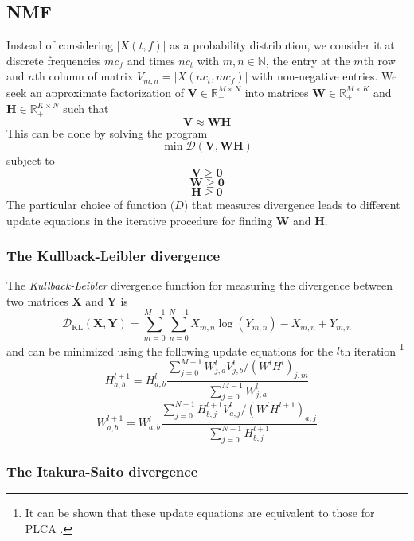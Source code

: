 \subsection{NMF}

Instead of considering $|X(t,f)|$ as a probability distribution, we
consider it at discrete frequencies $mc_{f}$ and times $nc_{t}$ with $m,n \in
\mathbb{N}$, the entry at the $m$th row and $n$th column of matrix
$V_{m,n}=|X(nc_{t},mc_{f})|$ with non-negative entries. We seek an
approximate factorization of $\boldsymbol{V} \in \mathbb{R}^{M \times N}_{+}$
into matrices $\boldsymbol{W} \in \mathbb{R}^{M \times K}_{+}$ and
$\boldsymbol{H} \in \mathbb{R}^{K \times N}_{+}$ such that
\begin{equation}
    \boldsymbol{V} \approx \boldsymbol{W}\boldsymbol{H}
    \label{eq:VaprxWH}
\end{equation}
This can be done by solving the program
\[
    \min \mathcal{D}(\boldsymbol{V},\boldsymbol{W}\boldsymbol{H})
\]
subject to
\[
    \boldsymbol{V} \geq \boldsymbol{0}
\]
\[
    \boldsymbol{W} \geq \boldsymbol{0}
\]
\[
    \boldsymbol{H} \geq \boldsymbol{0}
\]
The particular choice of function $\mathcal(D)$ that measures divergence leads
to different update equations in the iterative procedure for finding
$\boldsymbol{W}$ and $\boldsymbol{H}$.

\subsubsection{The Kullback-Leibler divergence \cite{lee2001algorithms}}

The \textit{Kullback-Leibler} divergence function for measuring the divergence
between two matrices $\boldsymbol{X}$ and $\boldsymbol{Y}$ is
\[
    \mathcal{D}_{\text{KL}}(\boldsymbol{X},\boldsymbol{Y}) =
    \sum_{m=0}^{M-1}\sum_{n=0}^{N-1} X_{m,n}\log(Y_{m,n})-X_{m,n}+Y_{m,n}
\]
and can be minimized using the following update equations for the $l$th iteration%
\footnote{It can be shown that these update equations are equivalent to those for PLCA 
\cite{shashanka2008probabilistic}.}
\[
    H_{a,b}^{l+1} =
    H_{a,b}^{l} \frac{\sum_{j=0}^{M-1}W_{j,a}^{l}V_{j,b}^{l} / (W^{l}H^{l})_{j,m}}
    {\sum_{j=0}^{M-1}W_{j,a}^{l}}
\]
\[
    W_{a,b}^{l+1} =
    W_{a,b}^{l} \frac{\sum_{j=0}^{N-1}H_{b,j}^{l+1}V_{a,j}^{l} / (W^{l}H^{l+1})_{a,j}}
    {\sum_{j=0}^{N-1}H_{b,j}^{l+1}}
\]

\subsubsection{The Itakura-Saito divergence \cite{fevotte2009nonnegative}}


